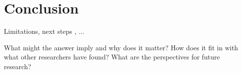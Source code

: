 \chapter{Conclusion}

Limitations, next steps , ...

What might the answer imply and why does it matter?
How does it fit in with what other researchers have found?
What are the perspectives for future research?
